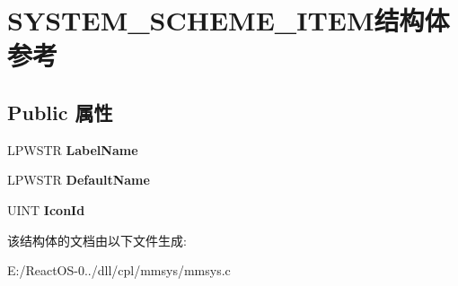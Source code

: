 \hypertarget{struct_s_y_s_t_e_m___s_c_h_e_m_e___i_t_e_m}{}\section{S\+Y\+S\+T\+E\+M\+\_\+\+S\+C\+H\+E\+M\+E\+\_\+\+I\+T\+E\+M结构体 参考}
\label{struct_s_y_s_t_e_m___s_c_h_e_m_e___i_t_e_m}
\subsection*{Public 属性}
\begin{DoxyCompactItemize}
\item 
\mbox{\label{struct_s_y_s_t_e_m___s_c_h_e_m_e___i_t_e_m_ac44eb09a49d6f18e2888bbfd3d9be50a}} 
L\+P\+W\+S\+TR {\bfseries Label\+Name}
\item 
\mbox{\label{struct_s_y_s_t_e_m___s_c_h_e_m_e___i_t_e_m_a505ebbe858906dd3e9692aae4f25d194}} 
L\+P\+W\+S\+TR {\bfseries Default\+Name}
\item 
\mbox{\label{struct_s_y_s_t_e_m___s_c_h_e_m_e___i_t_e_m_adf2398e04ea826854e18c606400fbdca}} 
U\+I\+NT {\bfseries Icon\+Id}
\end{DoxyCompactItemize}


该结构体的文档由以下文件生成\+:\begin{DoxyCompactItemize}
\item 
E\+:/\+React\+O\+S-\/0../dll/cpl/mmsys/mmsys.\+c\end{DoxyCompactItemize}
